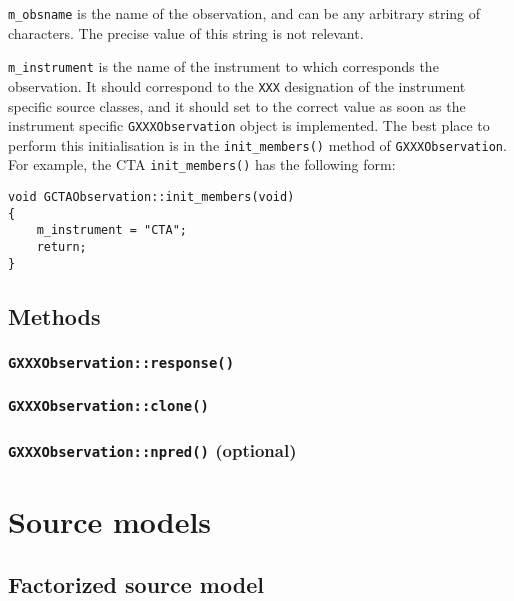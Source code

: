 \documentclass{article}[12pt,a4]
\begin{document}
{\tt m\_obsname} is the name of the observation, and can be any arbitrary string of
characters.
The precise value of this string is not relevant.

{\tt m\_instrument} is the name of the instrument to which corresponds the observation.
It should correspond to the {\tt XXX} designation of the instrument specific source
classes, and it should set to the correct value as soon as the instrument specific 
{\tt GXXXObservation} object is implemented.
The best place to perform this initialisation is in the {\tt init\_members()} method
of {\tt GXXXObservation}.
For example, the CTA {\tt init\_members()} has the following form:
\begin{verbatim}
void GCTAObservation::init_members(void)
{
    m_instrument = "CTA";
    return;
}
\end{verbatim}


\subsection{Methods}

\subsubsection{{\tt GXXXObservation::response()}}

\subsubsection{{\tt GXXXObservation::clone()}}

\subsubsection{{\tt GXXXObservation::npred()} (optional)}


\section{Source models}

\subsection{Factorized source model}
\end{document}
